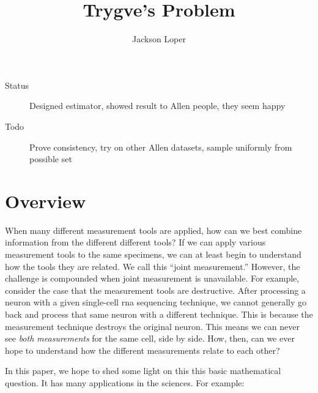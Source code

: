 




\title{Trygve's Problem}
\author{Jackson Loper}

\usepackage{amsthm}
\newtheorem{thm}{Theorem}
\newtheorem{conj}{Conjecture}


\maketitle

\begin{description}
  \item[Status] Designed estimator, showed result to Allen people, they seem happy
  \item[Todo] Prove consistency, try on other Allen datasets, sample uniformly from possible set
\end{description}


\section{Overview}

When many different measurement tools are applied, how can we best combine information from the different different tools?  If we can apply various measurement tools to the same specimens, we can at least begin to understand how the tools they are related.  We call this ``joint measurement.''  However, the challenge is compounded when joint measurement is unavailable.  For example, consider the case that the measurement tools are destructive.  After processing a neuron with a given single-cell rna sequencing technique, we cannot generally go back and process that same neuron with a different technique.  This is because the measurement technique destroys the original neuron.  This means we can never see \emph{both measurements} for the same cell, side by side.  How, then, can we ever hope to understand how the different measurements relate to each other?

In this paper, we hope to shed some light on this this basic mathematical question.  It has many applications in the sciences.  For example:

